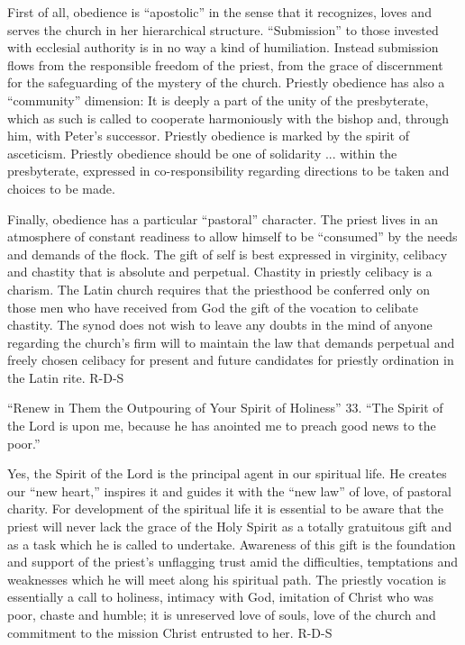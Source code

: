 \documentclass[oneside]{book}
\begin{document}
First of all, obedience is ``apostolic'' in the sense that it recognizes, loves
and serves the church in her hierarchical structure. ``Submission'' to those
invested with ecclesial authority is in no way a kind of humiliation. Instead
submission flows from the responsible freedom of the priest, from the grace of
discernment for the safeguarding of the mystery of the church.
Priestly obedience has also a ``community'' dimension: It is deeply a part of
the unity of the presbyterate, which as such is called to cooperate harmoniously
with the bishop and, through him, with Peter's successor. Priestly obedience is
marked by the spirit of asceticism. Priestly obedience should be one of
solidarity ... within the presbyterate, expressed in co-responsibility regarding
directions to be taken and choices to be made.

Finally, obedience has a particular ``pastoral'' character. The priest lives in
an atmosphere of constant readiness to allow himself to be ``consumed'' by the
needs and demands of the flock. The gift of self is best expressed in virginity,
celibacy and chastity that is absolute and perpetual. Chastity in priestly
celibacy is a charism. The Latin church requires that the priesthood be
conferred only on those men who have received from God the gift of the vocation
to celibate chastity. The synod does not wish to leave any doubts in the mind of
anyone regarding the church's firm will to maintain the law that demands
perpetual and freely chosen celibacy for present and future candidates for
priestly ordination in the Latin rite.
R-D-S

``Renew in Them the Outpouring of Your Spirit of Holiness''
33. ``The Spirit of the Lord is upon me, because he has anointed me to preach
good news to the poor.''

Yes, the Spirit of the Lord is the principal agent in our spiritual life. He
creates our ``new heart,'' inspires it and guides it with the ``new law'' of
love, of pastoral charity. For development of the spiritual life it is essential
to be aware that the priest will never lack the grace of the Holy Spirit as a
totally gratuitous gift and as a task which he is called to undertake. Awareness
of this gift is the foundation and support of the priest's unflagging trust amid
the difficulties, temptations and weaknesses which he will meet along his
spiritual path. The priestly vocation is essentially a call to holiness,
intimacy with God, imitation of Christ who was poor, chaste and humble; it is
unreserved love of souls, love of the church and commitment to the mission
Christ entrusted to her.
R-D-S
\end{document}
